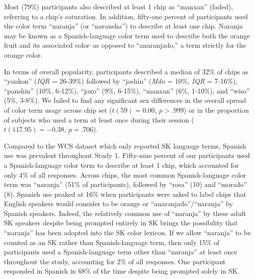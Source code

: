 \documentclass[
  english,
  ,apa7,floatsintext]{apa6}
\begin{document}
Most (79\%) participants also described at least 1 chip as ``manxan'' (faded), referring to a chip's saturation. In addition, fifty-one percent of participants used the color term ``naranja'' (or ``naransha'') to describe at least one chip. Naranja may be known as a Spanish-language color term used to describe both the orange fruit and its associated color--as opposed to ``anaranjado,'' a term strictly for the orange color.

In terms of overall popularity, participants described a median of 32\% of chips as ``yankon'' (\emph{IQR} = 26-39\%) followed by ``joshin'' (\emph{Mdn} = 10\%, \emph{IQR} = 7-16\%), ``panshin'' (10\%, 6-12\%), ``joxo'' (9\%, 6-15\%), ``manxan'' (6\%, 1-10\%), and ``wiso'' (5\%, 3-8\%). We failed to find any significant sex differences in the overall spread of color term usage across chip set (\(t(59) = 0.00\), \(p > .999\)) or in the proportion of subjects who used a term at least once during their session (\(t(117.95) = -0.38\), \(p = .706\)).

Compared to the WCS dataset which only reported SK language terms, Spanish use was prevalent throughout Study 1. Fifty-nine percent of our participants used a Spanish-language color term to describe at least 1 chip, which accounted for only 4\% of all responses. Across chips, the most common Spanish-language color term was ``naranja'' (51\% of participants), followed by ``rosa'' (10) and ``morado'' (8). Spanish use peaked at 16\% when participants were asked to label chips that English speakers would consider to be orange or ``anaranjado''/``naranja'' by Spanish speakers. Indeed, the relatively common use of ``naranja'' by these adult SK speakers despite being prompted entirely in SK brings the possibility that ``naranja'' has been adopted into the SK color lexicon. If we allow ``naranja'' to be counted as an SK rather than Spanish-language term, then only 15\% of participants used a Spanish-language term other than ``naranja'' at least once throughout the study, accounting for 2\% of all responses. One participant responded in Spanish in 68\% of the time despite being prompted solely in SK.
\end{document}
